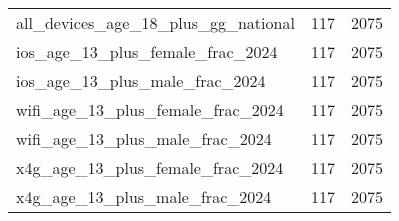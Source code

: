 \begin{table}[ht]
\begin{tabular}{lrr}
  all\_devices\_age\_18\_plus\_gg\_national & 117 & 2075 \\ 
  ios\_age\_13\_plus\_female\_frac\_2024 & 117 & 2075 \\ 
  ios\_age\_13\_plus\_male\_frac\_2024 & 117 & 2075 \\ 
  wifi\_age\_13\_plus\_female\_frac\_2024 & 117 & 2075 \\ 
  wifi\_age\_13\_plus\_male\_frac\_2024 & 117 & 2075 \\ 
  x4g\_age\_13\_plus\_female\_frac\_2024 & 117 & 2075 \\ 
  x4g\_age\_13\_plus\_male\_frac\_2024 & 117 & 2075 \\ 
   \hline
\end{tabular}
\end{table}
